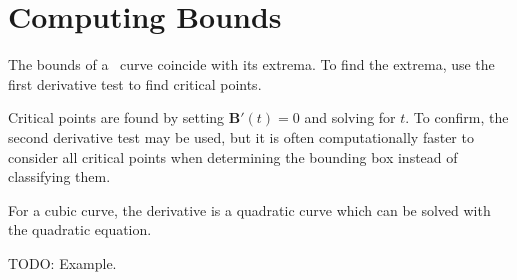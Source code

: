 \documentclass[oneside,usepdftitle=true]{article}
\begin{document}
\section{Computing Bounds}

The bounds of a \Bezier\ curve coincide with its extrema.  To find the extrema, use the first derivative test to find critical points.

Critical points are found by setting $\mathbf{B}'(t) = 0$ and solving for $t$.  To confirm, the second derivative test may be used, but it is often computationally faster to consider all critical points when determining the bounding box instead of classifying them.

For a cubic curve, the derivative is a quadratic curve which can be solved with the quadratic equation.

TODO: Example.

\newpage
\nocite{cs-lecture,bez-paper} %



\end{document}
